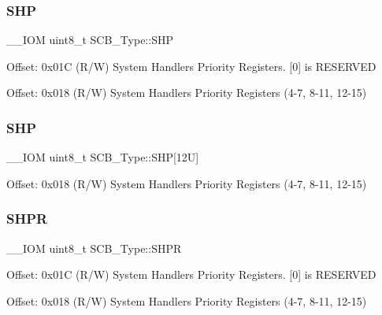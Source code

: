 \subsubsection{\texorpdfstring{S\+HP}{SHP}\hspace{0.1cm}{\footnotesize\ttfamily [1/2]}}
{\footnotesize\ttfamily \+\_\+\+\_\+\+I\+OM uint8\+\_\+t S\+C\+B\+\_\+\+Type\+::\+S\+HP}

Offset\+: 0x01C (R/W) System Handlers Priority Registers. \mbox{[}0\mbox{]} is R\+E\+S\+E\+R\+V\+ED

Offset\+: 0x018 (R/W) System Handlers Priority Registers (4-\/7, 8-\/11, 12-\/15) \mbox{\label{struct_s_c_b___type_a9b05f74580fc93daa7fe2f0e1c9c5663}} 
\subsubsection{\texorpdfstring{S\+HP}{SHP}\hspace{0.1cm}{\footnotesize\ttfamily [2/2]}}
{\footnotesize\ttfamily \+\_\+\+\_\+\+I\+OM uint8\+\_\+t S\+C\+B\+\_\+\+Type\+::\+S\+HP\mbox{[}12\+U\mbox{]}}

Offset\+: 0x018 (R/W) System Handlers Priority Registers (4-\/7, 8-\/11, 12-\/15) \mbox{\label{struct_s_c_b___type_ac6259676cd7892a1b62f3fa7c0930780}} 
\subsubsection{\texorpdfstring{S\+H\+PR}{SHPR}\hspace{0.1cm}{\footnotesize\ttfamily [1/2]}}
{\footnotesize\ttfamily \+\_\+\+\_\+\+I\+OM uint8\+\_\+t S\+C\+B\+\_\+\+Type\+::\+S\+H\+PR}

Offset\+: 0x01C (R/W) System Handlers Priority Registers. \mbox{[}0\mbox{]} is R\+E\+S\+E\+R\+V\+ED

Offset\+: 0x018 (R/W) System Handlers Priority Registers (4-\/7, 8-\/11, 12-\/15) \mbox{\label{struct_s_c_b___type_afdab23abd301033bb318c7b188b377db}} 
